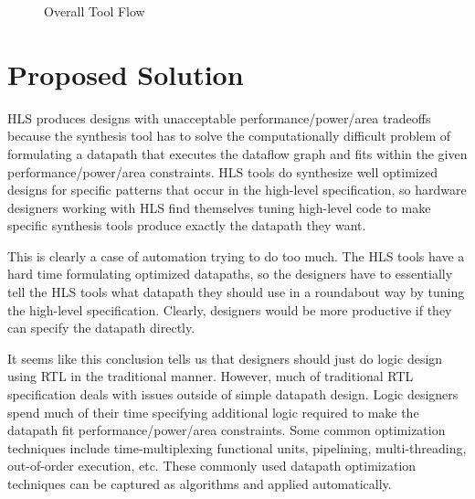 \begin{figure}
	\centering
    \caption{Overall Tool Flow}
	\label{fig:workflow}
\end{figure}

\section{Proposed Solution}
HLS produces designs with unacceptable performance/power/area tradeoffs because the synthesis tool has to solve the computationally difficult problem of formulating a datapath that executes the dataflow graph and fits within the given performance/power/area constraints. HLS tools do synthesize well optimized designs for specific patterns that occur in the high-level specification, so hardware designers working with HLS find themselves tuning high-level code to make specific synthesis tools produce exactly the datapath they want. 

This is clearly a case of automation trying to do too much. The HLS tools have a hard time formulating optimized datapaths, so the designers have to essentially tell the HLS tools what datapath they should use in a roundabout way by tuning the high-level specification. Clearly, designers would be more productive if they can specify the datapath directly. 

It seems like this conclusion tells us that designers should just do logic design using RTL in the traditional manner. However, much of traditional RTL specification deals with issues outside of simple datapath design. Logic designers spend much of their time specifying additional logic required to make the datapath fit performance/power/area constraints. Some common optimization techniques include time-multiplexing functional units, pipelining, multi-threading, out-of-order execution, etc. These commonly used datapath optimization techniques can be captured as algorithms and applied automatically.

